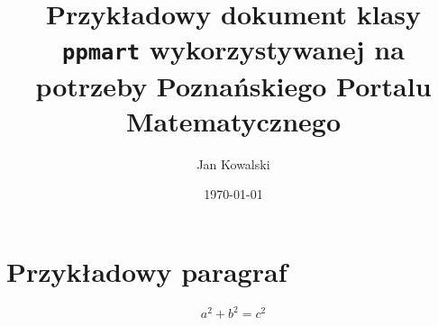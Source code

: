 \documentclass{ppmart}
\title{Przykładowy dokument klasy \texttt{ppmart} wykorzystywanej na potrzeby Poznańskiego Portalu Matematycznego}
\author{Jan Kowalski}
\date{\today}
\begin{document}
\maketitle

\section{Przykładowy paragraf}

\lipsum[1-2]

$$a^2 + b^2 = c^2$$

\lipsum[3]
\end{document}
